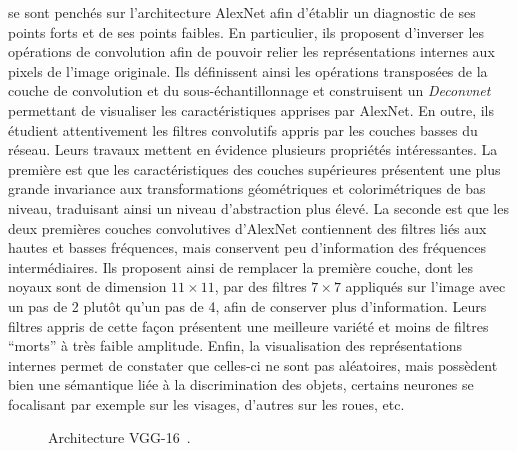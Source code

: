 \citet{zeiler_visualizing_2014} se sont penchés sur l'architecture AlexNet afin d'établir un diagnostic de ses points forts et de ses points faibles. En particulier, ils proposent d'inverser les opérations de convolution afin de pouvoir relier les représentations internes aux pixels de l'image originale. Ils définissent ainsi les opérations transposées de la couche de convolution et du sous-échantillonnage et construisent un \emph{Deconvnet} permettant de visualiser les caractéristiques apprises par AlexNet. En outre, ils étudient attentivement les filtres convolutifs appris par les couches basses du réseau. Leurs travaux mettent en évidence plusieurs propriétés intéressantes. La première est que les caractéristiques des couches supérieures présentent une plus grande invariance aux transformations géométriques et colorimétriques de bas niveau, traduisant ainsi un niveau d'abstraction plus élevé. La seconde est que les deux premières couches convolutives d'AlexNet contiennent des filtres liés aux hautes et basses fréquences, mais conservent peu d'information des fréquences intermédiaires. Ils proposent ainsi de remplacer la première couche, dont les noyaux sont de dimension $11\times11$, par des filtres $7\times7$ appliqués sur l'image avec un pas de 2 plutôt qu'un pas de 4, afin de conserver plus d'information. Leurs filtres appris de cette façon présentent une meilleure variété et moins de filtres ``morts'' à très faible amplitude. Enfin, la visualisation des représentations internes permet de constater que celles-ci ne sont pas aléatoires, mais possèdent bien une sémantique liée à la discrimination des objets, certains neurones se focalisant par exemple sur les visages, d'autres sur les roues, etc.

\begin{figure}[t]
  \resizebox{\textwidth}{!}{
    
  }
  \caption[Architecture VGG-16]{Architecture VGG-16~\cite{simonyan_very_2014}.}
  \label{fig:vgg}
\end{figure}


